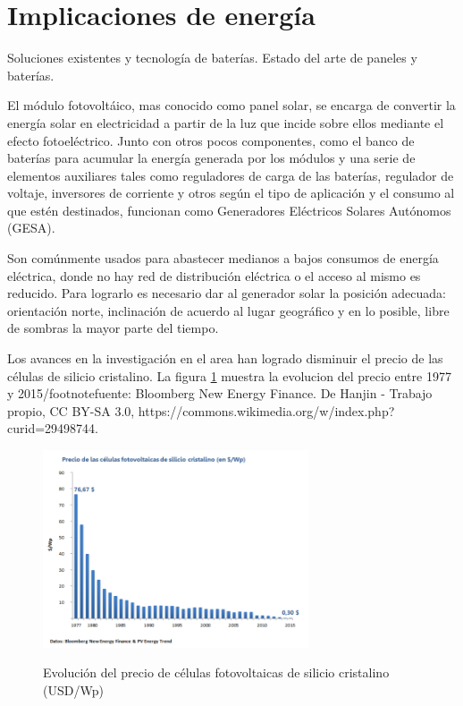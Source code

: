 \section{Implicaciones de energía}
\label{sec:energía}

Soluciones existentes y tecnología de baterías. Estado del arte de paneles y baterías.

El módulo fotovoltáico, mas conocido como panel solar, se encarga de convertir la energía solar en electricidad a partir de la luz que incide sobre ellos mediante el efecto fotoeléctrico. Junto con otros pocos componentes, como el banco de baterías para acumular la energía generada por los módulos y una serie de elementos auxiliares tales como reguladores de carga de las baterías, regulador de voltaje, inversores de corriente y otros según el tipo de aplicación y el consumo al que estén destinados, funcionan como Generadores Eléctricos Solares Autónomos (GESA).

Son comúnmente usados para abastecer medianos a bajos consumos de energía eléctrica, donde no hay red de distribución eléctrica o el acceso al mismo es reducido. Para lograrlo es necesario dar al generador solar la posición adecuada: orientación norte, inclinación de acuerdo al lugar geográfico y en lo posible, libre de sombras la mayor parte del tiempo.

Los avances en la investigación en el area han logrado disminuir el precio de las células de silicio cristalino. La figura \ref{fig:swanson} muestra la evolucion del precio entre 1977 y 2015/footnote{fuente: Bloomberg New Energy Finance. De Hanjin - Trabajo propio, CC BY-SA 3.0, https://commons.wikimedia.org/w/index.php?curid=29498744}.


\begin{figure}[h!]
	\centering
    \includegraphics[width=0.7\textwidth]{./Figures/SwansonEffect.png}
	\label{fig:swanson}
	\caption{Evolución del precio de células fotovoltaicas de silicio cristalino (USD/Wp)}
\end{figure}
